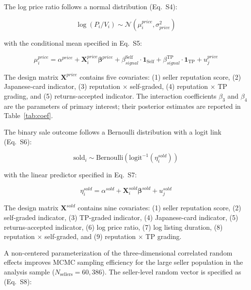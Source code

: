 \documentclass[11pt,letterpaper]{article}
\theoremstyle{definition}
\begin{document}
The log price ratio follows a normal distribution (Eq.~S4):

\begin{equation}
\log(P_i / V_i) \sim \mathcal{N}(\mu_i^{price}, \sigma_{price}^2) \label{eq:s4}
\end{equation}

with the conditional mean specified in Eq.~S5:

\begin{equation}
\mu_i^{price} = \alpha^{price} + \mathbf{X}_i^{price} \boldsymbol{\beta}^{price} + \beta_{signal}^{\text{Self}} \cdot \mathbf{1}_{\text{Self}} + \beta_{signal}^{\text{TP}} \cdot \mathbf{1}_{\text{TP}} + u_j^{price} \label{eq:s5}
\end{equation}

The design matrix $\mathbf{X}^{price}$ contains five covariates: (1) seller reputation score, (2) Japanese-card indicator, (3) reputation $\times$ self-graded, (4) reputation $\times$ TP grading, and (5) returns-accepted indicator. The interaction coefficients $\beta_3$ and $\beta_4$ are the parameters of primary interest; their posterior estimates are reported in Table~\ref{tab:coef}.

The binary sale outcome follows a Bernoulli distribution with a logit link (Eq.~S6):

\begin{equation}
\text{sold}_i \sim \text{Bernoulli}(\text{logit}^{-1}(\eta_i^{sold})) \label{eq:s6}
\end{equation}

with the linear predictor specified in Eq.~S7:

\begin{equation}
\eta_i^{sold} = \alpha^{sold} + \mathbf{X}_i^{sold} \boldsymbol{\beta}^{sold} + u_j^{sold} \label{eq:s7}
\end{equation}

The design matrix $\mathbf{X}^{sold}$ contains nine covariates: (1) seller reputation score, (2) self-graded indicator, (3) TP-graded indicator, (4) Japanese-card indicator, (5) returns-accepted indicator, (6) log price ratio, (7) log listing duration, (8) reputation $\times$ self-graded, and (9) reputation $\times$ TP grading.

A non-centered parameterization of the three-dimensional correlated random effects improves MCMC sampling efficiency for the large seller population in the analysis sample ($N_{\text{sellers}} = 60{,}386$). The seller-level random vector is specified as (Eq.~S8):
\end{document}
